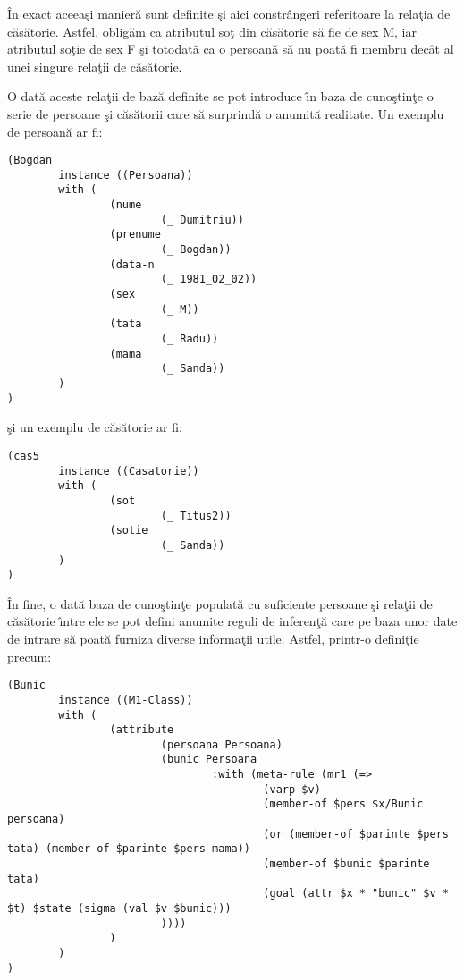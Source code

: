 \documentclass{article}
\begin{document}
\^{I}n exact aceea\c{s}i manier\u{a} sunt definite \c{s}i aici constr\^{a}ngeri
referitoare la rela\c{t}ia de c\u{a}s\u{a}torie. Astfel, oblig\u{a}m ca atributul
so\c{t} din c\u{a}s\u{a}torie s\u{a} fie de sex M, iar atributul so\c{t}ie de sex
F \c{s}i totodat\u{a} ca o persoan\u{a} s\u{a} nu poat\u{a} fi membru dec\^{a}t
al unei singure rela\c{t}ii de c\u{a}s\u{a}torie.

O dat\u{a} aceste rela\c{t}ii de baz\u{a} definite se pot introduce \^{\i}n baza
de cuno\c{s}tin\c{t}e o serie de persoane \c{s}i c\u{a}s\u{a}torii care s\u{a}
surprind\u{a} o anumit\u{a} realitate. Un exemplu de persoan\u{a} ar fi:

{\scriptsize
\begin{verbatim}
(Bogdan
        instance ((Persoana))
        with (
                (nume
                        (_ Dumitriu))
                (prenume
                        (_ Bogdan))
                (data-n
                        (_ 1981_02_02))
                (sex
                        (_ M))
                (tata
                        (_ Radu))
                (mama
                        (_ Sanda))
        )
)
\end{verbatim}
}

\c{s}i un exemplu de c\u{a}s\u{a}torie ar fi:

{\scriptsize
\begin{verbatim}
(cas5
        instance ((Casatorie))
        with (
                (sot
                        (_ Titus2))
                (sotie
                        (_ Sanda))
        )
)
\end{verbatim}
}

\^{I}n fine, o dat\u{a} baza de cuno\c{s}tin\c{t}e populat\u{a} cu suficiente
persoane \c{s}i rela\c{t}ii de c\u{a}s\u{a}torie \^{\i}ntre ele se pot defini
anumite reguli de inferen\c{t}\u{a} care pe baza unor date de intrare s\u{a}
poat\u{a} furniza diverse informa\c{t}ii utile. Astfel, printr-o defini\c{t}ie
precum:

{\scriptsize
\begin{verbatim}
(Bunic
        instance ((M1-Class))
        with (
                (attribute
                        (persoana Persoana)
                        (bunic Persoana
                                :with (meta-rule (mr1 (=>
                                        (varp $v)
                                        (member-of $pers $x/Bunic persoana)
                                        (or (member-of $parinte $pers tata) (member-of $parinte $pers mama))
                                        (member-of $bunic $parinte tata)
                                        (goal (attr $x * "bunic" $v * $t) $state (sigma (val $v $bunic)))
                        ))))
                )
        )
)
\end{verbatim}
}
\end{document}
